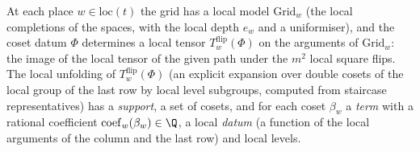 \begin{definition}\label{def:pf:rowprops:local}
At each place $w\in\mathrm{loc}(t)$ the grid has a local model $\mathrm{Grid}_w$ (the local completions of the spaces,
with the local depth $e_w$ and a uniformiser), and the coset datum $\Phi$ determines a local tensor
$T^{\mathrm{flip}}_w(\Phi)$ on the arguments of $\mathrm{Grid}_w$: the image of the local tensor of the given path under
the $m^2$ local square flips. The local unfolding of $T^{\mathrm{flip}}_w(\Phi)$ (an explicit expansion over double cosets
of the local group of the last row by local level subgroups, computed from staircase representatives) has a
\emph{support}, a set of cosets, and for each coset $\beta_w$ a \emph{term} with a rational coefficient
$\mathrm{coef}_w(\beta_w)\in\Q$, a local \emph{datum} (a function of the local arguments of the column and the last row)
and local levels.
\end{definition}

